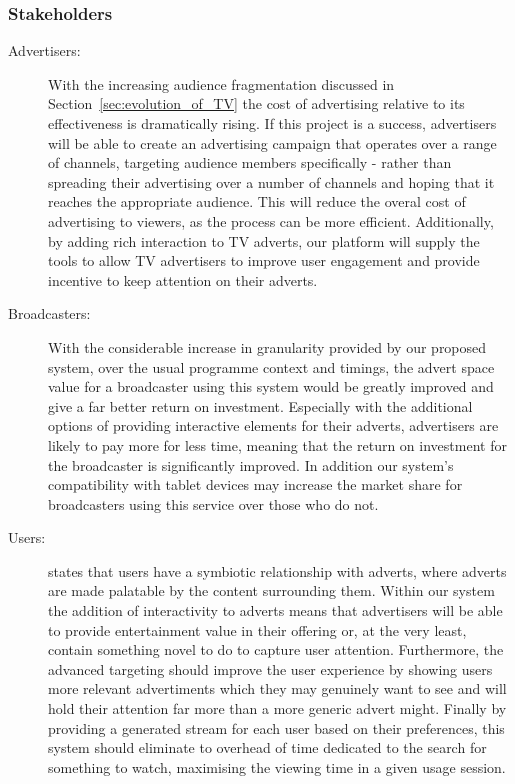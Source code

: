 \subsubsection{Stakeholders}
\begin{description}
\item[Advertisers:]{With the increasing audience fragmentation discussed in Section~\ref{sec:evolution_of_TV} the cost of advertising relative to its effectiveness is dramatically rising. If this project is a success, advertisers will be able to create an advertising campaign that operates over a range of channels, targeting audience members specifically - rather than spreading their advertising over a number of channels and hoping that it reaches the appropriate audience. This will reduce the overal cost of advertising to viewers, as the process can be more efficient. Additionally, by adding rich interaction to TV adverts, our platform will supply the tools to allow TV advertisers to improve user engagement and provide incentive to keep attention on their adverts.}
\item[Broadcasters:]{With the considerable increase in granularity provided by our proposed system, over the usual programme context and timings, the advert space value for a broadcaster using this system would be greatly improved and give a far better return on investment. Especially with the additional options of providing interactive elements for their adverts, advertisers are likely to pay more for less time, meaning that the return on investment for the broadcaster is significantly improved. In addition our system's compatibility with tablet devices may increase the market share for broadcasters using this service over those who do not.}
\item[Users:]{\citet{broadcastEconomics} states that users have a symbiotic relationship with adverts, where adverts are made palatable by the content surrounding them. Within our system the addition of interactivity to adverts means that advertisers will be able to provide entertainment value in their offering or, at the very least, contain something novel to do to capture user attention. Furthermore, the advanced targeting should improve the user experience by showing users more relevant advertiments which they may genuinely want to see and will hold their attention far more than a more generic advert might. Finally by providing a generated stream for each user based on their preferences, this system should eliminate to overhead of time dedicated to the search for something to watch, maximising the viewing time in a given usage session.}

\end{description}
